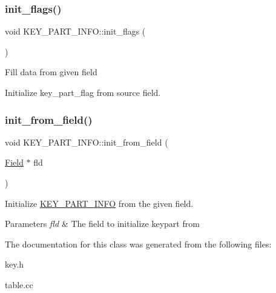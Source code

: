 \subsubsection{\texorpdfstring{init\+\_\+flags()}{init\_flags()}}
{\footnotesize\ttfamily void K\+E\+Y\+\_\+\+P\+A\+R\+T\+\_\+\+I\+N\+F\+O\+::init\+\_\+flags (\begin{DoxyParamCaption}{ }\end{DoxyParamCaption})}

Fill data from given field

Initialize key\+\_\+part\+\_\+flag from source field. \mbox{\label{classKEY__PART__INFO_a5cbdb2fd6efbec7017e21d3abfa5af84}} 
\subsubsection{\texorpdfstring{init\+\_\+from\+\_\+field()}{init\_from\_field()}}
{\footnotesize\ttfamily void K\+E\+Y\+\_\+\+P\+A\+R\+T\+\_\+\+I\+N\+F\+O\+::init\+\_\+from\+\_\+field (\begin{DoxyParamCaption}\item[{\mbox{\hyperlink{classField}{Field}} $\ast$}]{fld }\end{DoxyParamCaption})}

Initialize \mbox{\hyperlink{classKEY__PART__INFO}{K\+E\+Y\+\_\+\+P\+A\+R\+T\+\_\+\+I\+N\+FO}} from the given field.


\begin{DoxyParams}{Parameters}
{\em fld} & The field to initialize keypart from \\
\hline
\end{DoxyParams}


The documentation for this class was generated from the following files\+:\begin{DoxyCompactItemize}
\item 
key.\+h\item 
table.\+cc\end{DoxyCompactItemize}
